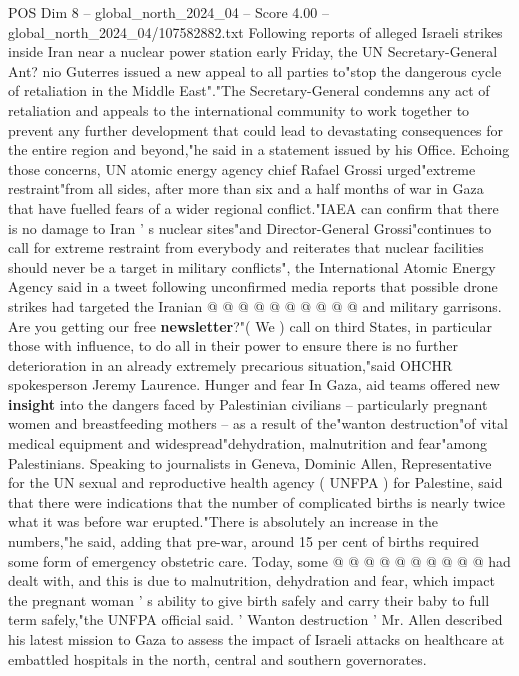 \begin{textsample}{POS Dim 8 – global\_north\_2024\_04 – Score 4.00 – global\_north\_2024\_04/107582882.txt}  \label{ex:f8_pos_315}
Following reports of alleged Israeli strikes inside Iran near a nuclear power station early Friday, the UN Secretary-General Ant? nio Guterres issued a new appeal to all parties to"stop the dangerous cycle of retaliation in the Middle East"."The Secretary-General condemns any act of retaliation and appeals to the international community to work together to prevent any further development that could lead to devastating consequences for the entire region and beyond,"he said in a statement issued by his Office.
Echoing those concerns, UN atomic energy agency chief Rafael Grossi urged"extreme restraint"from all sides, after more than six and a half months of war in Gaza that have fuelled fears of a wider regional conflict."IAEA can confirm that there is no damage to Iran ' s nuclear sites"and Director-General Grossi"continues to call for extreme restraint from everybody and reiterates that nuclear facilities should never be a target in military conflicts", the International Atomic Energy Agency said in a tweet following unconfirmed media reports that possible drone strikes had targeted the Iranian @ @ @ @ @ @ @ @ @ @ and military garrisons.
Are you getting our free \textbf{newsletter}?"( We ) call on third States, in particular those with influence, to do all in their power to ensure there is no further deterioration in an already extremely precarious situation,"said OHCHR spokesperson Jeremy Laurence.
Hunger and fear In Gaza, aid teams offered new \textbf{insight} into the dangers faced by Palestinian civilians -- particularly pregnant women and breastfeeding mothers -- as a result of the"wanton destruction"of vital medical equipment and widespread"dehydration, malnutrition and fear"among Palestinians.
Speaking to journalists in Geneva, Dominic Allen, Representative for the UN sexual and reproductive health agency ( UNFPA ) for Palestine, said that there were indications that the number of complicated births is nearly twice what it was before war erupted."There is absolutely an increase in the numbers,"he said, adding that pre-war, around 15 per cent of births required some form of emergency obstetric care.
Today, some @ @ @ @ @ @ @ @ @ @ had dealt with, and this is due to malnutrition, dehydration and fear, which impact the pregnant woman ' s ability to give birth safely and carry their baby to full term safely,"the UNFPA official said. ' Wanton destruction ' Mr.
Allen described his latest mission to Gaza to assess the impact of Israeli attacks on healthcare at embattled hospitals in the north, central and southern governorates.

\end{textsample}
